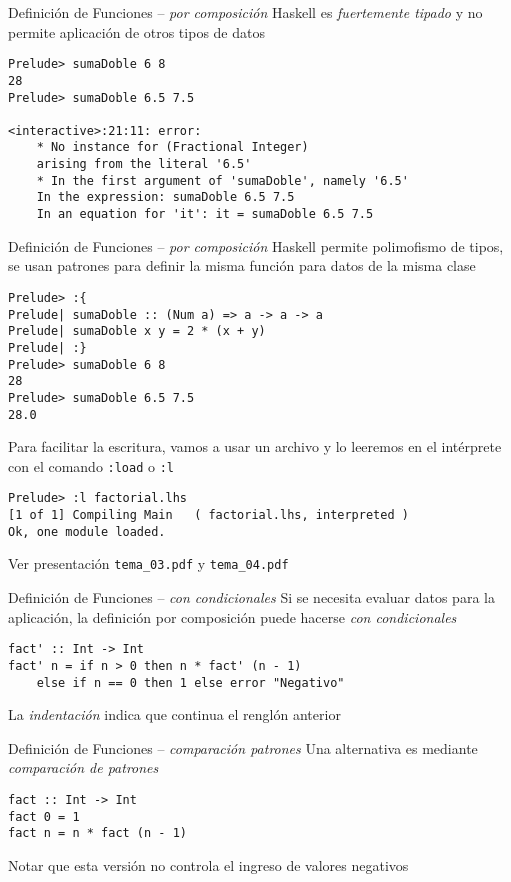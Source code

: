 \begin{frame}[fragile]{Definición de Funciones -- \emph{por composición}}
    Haskell es \emph{fuertemente tipado} y no permite aplicación de otros tipos de datos
    \begin{lstlisting}[style=consola]
Prelude> sumaDoble 6 8
28
Prelude> sumaDoble 6.5 7.5

<interactive>:21:11: error:
    * No instance for (Fractional Integer)
    arising from the literal '6.5'
    * In the first argument of 'sumaDoble', namely '6.5'
    In the expression: sumaDoble 6.5 7.5
    In an equation for 'it': it = sumaDoble 6.5 7.5
    \end{lstlisting}
\end{frame}

\begin{frame}[fragile]{Definición de Funciones -- \emph{por composición}}
    Haskell permite polimofismo de tipos, se usan patrones para
    definir la misma función para datos de la misma clase
    \begin{lstlisting}[style=consola]
Prelude> :{
Prelude| sumaDoble :: (Num a) => a -> a -> a
Prelude| sumaDoble x y = 2 * (x + y)
Prelude| :}
Prelude> sumaDoble 6 8
28
Prelude> sumaDoble 6.5 7.5
28.0
    \end{lstlisting}
    Para facilitar la escritura, vamos a usar un archivo y lo leeremos en el intérprete con el comando \verb|:load| o \verb|:l|
    \begin{lstlisting}[style=consola]
Prelude> :l factorial.lhs 
[1 of 1] Compiling Main   ( factorial.lhs, interpreted )
Ok, one module loaded.
    \end{lstlisting}
    Ver presentación \verb|tema_03.pdf| y \verb|tema_04.pdf|
\end{frame}

\begin{frame}[fragile]{Definición de Funciones -- \emph{con condicionales}}
    Si se necesita evaluar datos para la aplicación, la definición por composición puede hacerse \emph{con condicionales}
    \begin{lstlisting}[style=consola]
fact' :: Int -> Int
fact' n = if n > 0 then n * fact' (n - 1)
    else if n == 0 then 1 else error "Negativo"
    \end{lstlisting}
    La \emph{indentación} indica que continua el renglón anterior
\end{frame}

\begin{frame}[fragile]{Definición de Funciones -- \emph{comparación patrones}}
    Una alternativa es mediante \emph{comparación de patrones}
    \begin{lstlisting}[style=consola]
fact :: Int -> Int
fact 0 = 1
fact n = n * fact (n - 1)
    \end{lstlisting}
    Notar que esta versión no controla el ingreso de valores negativos
\end{frame}

